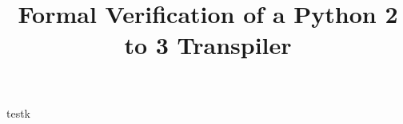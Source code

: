 \documentclass[sigplan, nonacm, anonymous, screen, natbib=false]{acmart}
\title{Formal Verification of a Python 2 to 3 Transpiler}
\begin{document}
\maketitle
testk
\printbibliography
\end{document}

